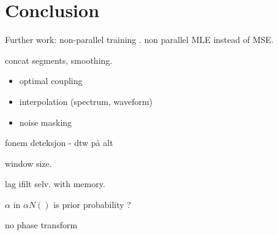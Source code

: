\chapter{Conclusion} %
\label{cha:conclusion}
Further work: non-parallel training \cite{mouchtaris06}. non parallel \cite{ye06} MLE instead of MSE.

concat segments, smoothing.
\begin{itemize}
	\item optimal coupling
	\item interpolation (spectrum, waveform)
	\item noise masking
\end{itemize}

fonem deteksjon - dtw på alt

window size.


lag ifilt selv. with memory.


$\alpha$ in $\alpha N()$ is prior probability ?


no phase transform



